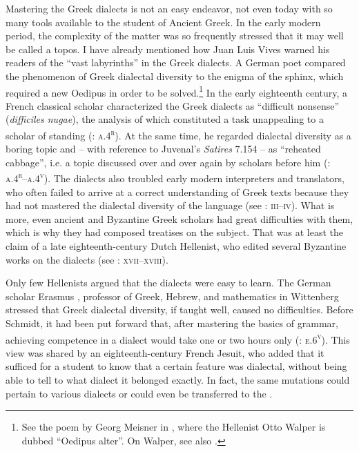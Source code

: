 Mastering the Greek dialects is not an easy endeavor, not even today with so many tools available to the student of Ancient Greek. In the early modern period, the complexity of the matter was so frequently stressed that it may well be called a topos. I have already mentioned how Juan Luis Vives warned his readers of the “vast labyrinths” in the Greek dialects. A German poet compared the phenomenon of Greek dialectal diversity to the enigma of the sphinx, which required a new Oedipus in order to be solved.\footnote{See the poem by Georg Meisner in \citet[††.2\textsc{\textsuperscript{r}}]{Walper1589}, where the Hellenist Otto Walper is dubbed “Oedipus alter”. On Walper, see also \citet[]{VanRooyFcc}.} In the early eighteenth century, a French classical scholar characterized the Greek dialects as “difficult nonsense” (\textit{difficiles nugae}), the analysis of which constituted a task unappealing to a scholar of standing (\citealt{Maittaire1706}: \textsc{a.4}\textsc{\textsuperscript{r}}). At the same time, he regarded dialectal diversity as a boring topic and – with reference to Juvenal’s \textit{Satires} 7.154 – as “reheated cabbage”, i.e. a topic discussed over and over again by scholars before him (\citealt{Maittaire1706}: \textsc{a.4}\textsc{\textsuperscript{r}}--\textsc{a.4}\textsc{\textsuperscript{v}}). The dialects also troubled early modern interpreters and translators, who often failed to arrive at a correct understanding of Greek texts because they had not mastered the dialectal diversity of the language (see \citealt{Facius1782}: \textsc{iii–iv}). What is more, even ancient and Byzantine Greek scholars had great difficulties with them, which is why they had composed treatises on the subject. That was at least the claim of a late eighteenth-century Dutch Hellenist, who edited several Byzantine works on the dialects (see \citealt{Koen1766}: \textsc{xvii–xviii}).

Only few Hellenists argued that the dialects were easy to learn. The German scholar Erasmus \citet[):(.2\textsc{\textsuperscript{r}}]{Schmidt1604}, professor of Greek, Hebrew, and mathematics in Wittenberg stressed that Greek dialectal diversity, if taught well, caused no difficulties. Before Schmidt, it had been put forward that, after mastering the basics of grammar, achieving competence in a dialect would take one or two hours only (\citealt{Caselius1560}: \textsc{e.6}\textsc{\textsuperscript{v}}). This view was shared by an eighteenth-century French Jesuit, who added that it sufficed for a student to know that a certain feature was dialectal, without being able to tell to what dialect it belonged exactly. In fact, the same mutations could pertain to various dialects or could even be transferred to the  \citep[101]{Giraudeau1739}.

